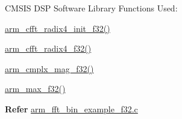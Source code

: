 \begin{DoxyParagraph}{C\-M\-S\-I\-S D\-S\-P Software Library Functions Used\-:}

\end{DoxyParagraph}
\begin{DoxyParagraph}{}

\begin{DoxyItemize}
\item \hyperlink{group___c_f_f_t___c_i_f_f_t_gaf336459f684f0b17bfae539ef1b1b78a}{arm\-\_\-cfft\-\_\-radix4\-\_\-init\-\_\-f32()}
\item \hyperlink{group___c_f_f_t___c_i_f_f_t_ga521f670cd9c571bc61aff9bec89f4c26}{arm\-\_\-cfft\-\_\-radix4\-\_\-f32()}
\item \hyperlink{group__cmplx__mag_gae45024c497392cde2ae358a76d435213}{arm\-\_\-cmplx\-\_\-mag\-\_\-f32()}
\item \hyperlink{group___max_ga5b89d1b04575aeec494f678695fb87d8}{arm\-\_\-max\-\_\-f32()}
\end{DoxyItemize}
\end{DoxyParagraph}
{\bfseries  Refer } \hyperlink{arm_fft_bin_example_f32_8c-example}{arm\-\_\-fft\-\_\-bin\-\_\-example\-\_\-f32.\-c} 